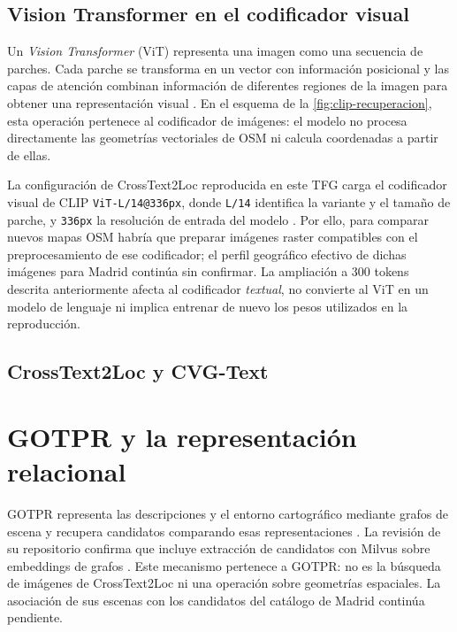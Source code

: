 \subsection{Vision Transformer en el codificador visual}
\label{sec:fundamentos-vit}
Un \emph{Vision Transformer} (ViT) representa una imagen como una secuencia de parches. Cada parche se transforma en un vector con información posicional y las capas de atención combinan información de diferentes regiones de la imagen para obtener una representación visual \cite{dosovitskiy2021vit}. En el esquema de la \cref{fig:clip-recuperacion}, esta operación pertenece al codificador de imágenes: el modelo no procesa directamente las geometrías vectoriales de OSM ni calcula coordenadas a partir de ellas.

La configuración de CrossText2Loc reproducida en este TFG carga el codificador visual de CLIP \texttt{ViT-L/14@336px}, donde \texttt{L/14} identifica la variante y el tamaño de parche, y \texttt{336px} la resolución de entrada del modelo \cite{ye2025crosstext,cvg:codigo}. Por ello, para comparar nuevos mapas OSM habría que preparar imágenes raster compatibles con el preprocesamiento de ese codificador; el perfil geográfico efectivo de dichas imágenes para Madrid continúa sin confirmar. La ampliación a 300 tokens descrita anteriormente afecta al codificador \emph{textual}, no convierte al ViT en un modelo de lenguaje ni implica entrenar de nuevo los pesos utilizados en la reproducción.

\subsection{CrossText2Loc y CVG-Text}
\label{sec:arte-cross-cvg-text}

\section{GOTPR y la representación relacional}
\label{sec:arte-gotpr}
GOTPR representa las descripciones y el entorno cartográfico mediante grafos de escena y recupera candidatos comparando esas representaciones \cite{jung2025gotpr}. La revisión de su repositorio confirma que incluye extracción de candidatos con Milvus sobre embeddings de grafos \cite{gotpr:codigo}. Este mecanismo pertenece a GOTPR: no es la búsqueda de imágenes de CrossText2Loc ni una operación sobre geometrías espaciales. La asociación de sus escenas con los candidatos del catálogo de Madrid continúa pendiente.

